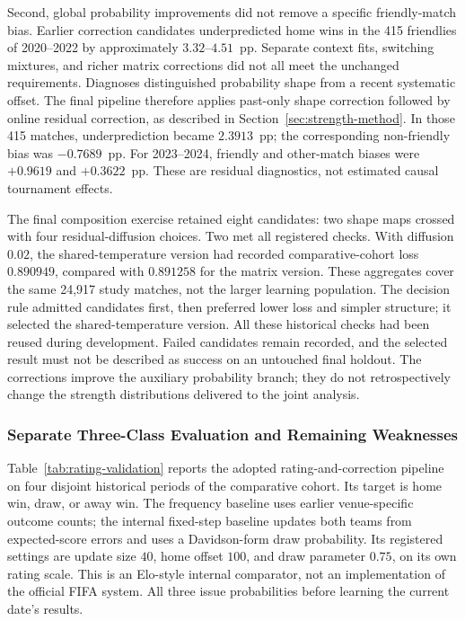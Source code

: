 Second, global probability improvements did not remove a specific friendly-match bias. Earlier correction candidates underpredicted home wins in the 415 friendlies of 2020--2022 by approximately $3.32$--$4.51$~pp. Separate context fits, switching mixtures, and richer matrix corrections did not all meet the unchanged requirements. Diagnoses distinguished probability shape from a recent systematic offset. The final pipeline therefore applies past-only shape correction followed by online residual correction, as described in Section~\ref{sec:strength-method}. In those 415 matches, underprediction became $2.3913$~pp; the corresponding non-friendly bias was $-0.7689$~pp. For 2023--2024, friendly and other-match biases were $+0.9619$ and $+0.3622$~pp. These are residual diagnostics, not estimated causal tournament effects.

The final composition exercise retained eight candidates: two shape maps crossed with four residual-diffusion choices. Two met all registered checks. With diffusion $0.02$, the shared-temperature version had recorded comparative-cohort loss $0.890949$, compared with $0.891258$ for the matrix version. These aggregates cover the same 24,917 study matches, not the larger learning population. The decision rule admitted candidates first, then preferred lower loss and simpler structure; it selected the shared-temperature version. All these historical checks had been reused during development. Failed candidates remain recorded, and the selected result must not be described as success on an untouched final holdout. The corrections improve the auxiliary probability branch; they do not retrospectively change the strength distributions delivered to the joint analysis.

\subsubsection{Separate Three-Class Evaluation and Remaining Weaknesses}

Table~\ref{tab:rating-validation} reports the adopted rating-and-correction pipeline on four disjoint historical periods of the comparative cohort. Its target is home win, draw, or away win. The frequency baseline uses earlier venue-specific outcome counts; the internal fixed-step baseline updates both teams from expected-score errors and uses a Davidson-form draw probability. Its registered settings are update size $40$, home offset $100$, and draw parameter $0.75$, on its own rating scale. This is an Elo-style internal comparator, not an implementation of the official FIFA system. All three issue probabilities before learning the current date's results.

